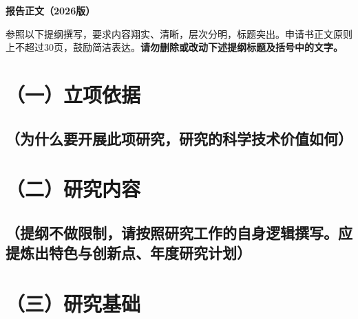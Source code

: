 \documentclass[12pt,UTF8,AutoFakeBold=2.5,a4paper,fontset=none]{ctexart} %
\begin{document}
{\centering
\vspace{-0.5em}
{\sanhao \templatefont \bfseries 报告正文（2026版）}\par
\vspace{1em}
}

{\sihao \templatefont \hspace*{2em}参照以下提纲撰写，要求内容翔实、清晰，层次分明，标题突出。\linebreak{}申请书正文原则上不超过30页，鼓励简洁表达。{\bfseries \color{MsBlue}请勿删除或改动下述提纲标题及括号中的文字。}}

\vspace{-2pt} %
\section{（一）立项依据}

\subsection{（为什么要开展此项研究，研究的科学技术价值如何）}





\section{（二）研究内容}

\subsection{\texorpdfstring{\hspace{0.1em}}{}（提纲不做限制，请按照研究工作的自身逻辑撰写。应提炼出特\linebreak{}色与创新点、年度研究计划）}

\setcounter{subsection}{2} %







\section{（三）研究基础}
\end{document}
